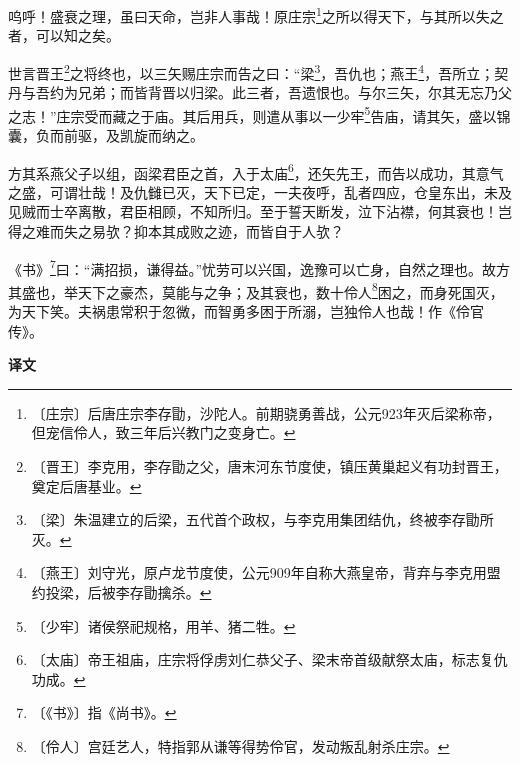 \documentclass[12pt,UTF-8,openany,a4]{ctexbook}
\begin{document}
\begin{large}
    
    呜呼！盛衰之理，虽曰天命，岂非人事哉！原庄宗\footnote{〔庄宗〕\yiwen 后唐庄宗李存勖，沙陀人。前期骁勇善战，公元923年灭后梁称帝，但宠信伶人，致三年后兴教门之变身亡。}之所以得天下，与其所以失之者，可以知之矣。
    
    世言晋王\footnote{〔晋王〕\yiwen 李克用，李存勖之父，唐末河东节度使，镇压黄巢起义有功封晋王，奠定后唐基业。}之将终也，以三矢赐庄宗而告之曰：“梁\footnote{〔梁〕\yiwen 朱温建立的后梁，五代首个政权，与李克用集团结仇，终被李存勖所灭。}，吾仇也；燕王\footnote{〔燕王〕\yiwen 刘守光，原卢龙节度使，公元909年自称大燕皇帝，背弃与李克用盟约投梁，后被李存勖擒杀。}，吾所立；契丹与吾约为兄弟；而皆背晋以归梁。此三者，吾遗恨也。与尔三矢，尔其无忘乃父之志！”庄宗受而藏之于庙。其后用兵，则遣从事以一少牢\footnote{〔少牢〕\yiwen 诸侯祭祀规格，用羊、猪二牲。}告庙，请其矢，盛以锦囊，负而前驱，及凯旋而纳之。
    
    方其系燕父子以组，函梁君臣之首，入于太庙\footnote{〔太庙〕\yiwen 帝王祖庙，庄宗将俘虏刘仁恭父子、梁末帝首级献祭太庙，标志复仇功成。}，还矢先王，而告以成功，其意气之盛，可谓壮哉！及仇雠已灭，天下已定，一夫夜呼，乱者四应，仓皇东出，未及见贼而士卒离散，君臣相顾，不知所归。至于誓天断发，泣下沾襟，何其衰也！岂得之难而失之易欤？抑本其成败之迹，而皆自于人欤？
    
    《书》\footnote{〔《书》〕\yiwen 指《尚书》。}曰：“满招损，谦得益。”忧劳可以兴国，逸豫可以亡身，自然之理也。故方其盛也，举天下之豪杰，莫能与之争；及其衰也，数十伶人\footnote{〔伶人〕\yiwen 宫廷艺人，特指郭从谦等得势伶官，发动叛乱射杀庄宗。}困之，而身死国灭，为天下笑。夫祸患常积于忽微，而智勇多困于所溺，岂独伶人也哉！作《伶官传》。
\end{large}


\newpage

\begin{Large}
    \noindent\textbf{译文}
\end{Large}


\vspace{1em}
\end{document}
